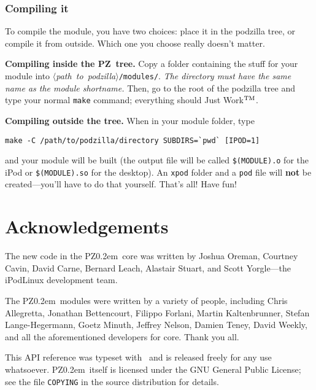 \documentclass[12pt,letterpaper]{report}
\def\pz{{\footnotesize PZ}}
\def\pzt{\pz\kern0.2em{\large\oldstyle2}}
\let\ttt\tt
\def\tt{\def\_{{\ttt\char`\_}}\ttt}
\def\<#1>{\leavevmode\hbox{$\langle${\sl#1\/}$\rangle$}}
\begin{document}
\subsection{Compiling it}
To compile the module, you have two choices: place it in the podzilla tree, or compile it
from outside. Which one you choose really doesn't matter.

{\bf Compiling inside the \pz\ tree.} Copy a folder containing the stuff for your module
into \<path to podzilla>\verb|/modules/|. {\sl The directory must have the same name
as the module shortname.} Then, go to the root of the podzilla tree and type your normal
\verb|make| command; everything should Just Work$^{\rm TM}$.

{\bf Compiling outside the tree.} When in your module folder, type
\begin{verbatim}
make -C /path/to/podzilla/directory SUBDIRS=`pwd` [IPOD=1]
\end{verbatim}
and your module will be built (the output file will be called {\tt \$(MODULE).o} for the iPod or
{\tt \$(MODULE).so} for the desktop). An {\tt xpod} folder and a {\tt pod} file will {\bf not} be
created---you'll have to do that yourself.
\vskip1cm
{\centering\LARGE\sc That's all! Have fun!}

\chapter{Acknowledgements}
The new code in the \pzt\ core was written by Joshua Oreman, 
Courtney Cavin, David Carne, Bernard Leach, Alastair Stuart,
and Scott Yorgle---the iPodLinux development team.

The \pzt\ modules were written by a variety of people, including
Chris Allegretta,
Jonathan Bettencourt,
Filippo Forlani,
Martin Kaltenbrunner,
Stefan Lange-Hegermann,
Goetz Minuth,
Jeffrey Nelson,
Damien Teney,
David Weekly,
and all the aforementioned developers for core. Thank you all.

This API reference was typeset with \LaTeXe\ and is released freely for any use whatsoever. \pzt\ itself
is licensed under the GNU General Public License; see the file \verb|COPYING| in the source
distribution for details.
\end{document}
